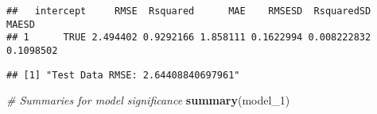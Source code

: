 \documentclass[
]{article}
\newenvironment{Shaded}{\begin{snugshade}}{\end{snugshade}}
\newcommand{\AttributeTok}[1]{\textcolor[rgb]{0.13,0.29,0.53}{#1}}
\newcommand{\CommentTok}[1]{\textcolor[rgb]{0.56,0.35,0.01}{\textit{#1}}}
\newcommand{\DecValTok}[1]{\textcolor[rgb]{0.00,0.00,0.81}{#1}}
\newcommand{\FunctionTok}[1]{\textcolor[rgb]{0.13,0.29,0.53}{\textbf{#1}}}
\newcommand{\NormalTok}[1]{#1}
\newcommand{\OtherTok}[1]{\textcolor[rgb]{0.56,0.35,0.01}{#1}}
\newcommand{\SpecialCharTok}[1]{\textcolor[rgb]{0.81,0.36,0.00}{\textbf{#1}}}
\newcommand{\StringTok}[1]{\textcolor[rgb]{0.31,0.60,0.02}{#1}}
\begin{document}
\begin{verbatim}
##   intercept     RMSE  Rsquared      MAE    RMSESD  RsquaredSD     MAESD
## 1      TRUE 2.494402 0.9292166 1.858111 0.1622994 0.008222832 0.1098502
\end{verbatim}

\begin{Shaded}
\end{Shaded}

\begin{verbatim}
## [1] "Test Data RMSE: 2.64408840697961"
\end{verbatim}

\begin{Shaded}
\begin{Highlighting}[]
\CommentTok{\# Summaries for model significance}
\FunctionTok{summary}\NormalTok{(model\_1)}
\end{Highlighting}
\end{Shaded}
\end{document}
